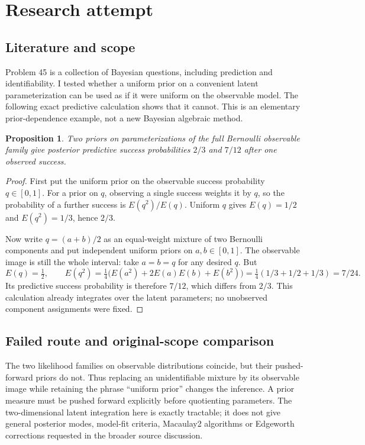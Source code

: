 \documentclass[11pt]{article}
\newtheorem{proposition}{Proposition}
\begin{document}
\section{Research attempt}
\subsection{Literature and scope}
Problem 45 is a collection of Bayesian questions, including prediction and identifiability. I tested whether a uniform prior on a convenient latent parameterization can be used as if it were uniform on the observable model. The following exact predictive calculation shows that it cannot. This is an elementary prior-dependence example, not a new Bayesian algebraic method.
\begin{proposition}
Two priors on parameterizations of the full Bernoulli observable family give posterior predictive success probabilities $2/3$ and $7/12$ after one observed success.
\end{proposition}
\begin{proof}
First put the uniform prior on the observable success probability $q\in[0,1]$. For a prior on $q$, observing a single success weights it by $q$, so the probability of a further success is $E(q^2)/E(q)$. Uniform $q$ gives $E(q)=1/2$ and $E(q^2)=1/3$, hence $2/3$.

Now write $q=(a+b)/2$ as an equal-weight mixture of two Bernoulli components and put independent uniform priors on $a,b\in[0,1]$. The observable image is still the whole interval: take $a=b=q$ for any desired $q$. But
\[
E(q)=\tfrac12,\qquad E(q^2)=\tfrac14\bigl(E(a^2)+2E(a)E(b)+E(b^2)\bigr)
=\tfrac14(1/3+1/2+1/3)=7/24.
\]
Its predictive success probability is therefore $7/12$, which differs from $2/3$. This calculation already integrates over the latent parameters; no unobserved component assignments were fixed.
\end{proof}
\subsection{Failed route and original-scope comparison}
The two likelihood families on observable distributions coincide, but their pushed-forward priors do not. Thus replacing an unidentifiable mixture by its observable image while retaining the phrase ``uniform prior'' changes the inference. A prior measure must be pushed forward explicitly before quotienting parameters. The two-dimensional latent integration here is exactly tractable; it does not give general posterior modes, model-fit criteria, Macaulay2 algorithms or Edgeworth corrections requested in the broader source discussion.
\end{document}
